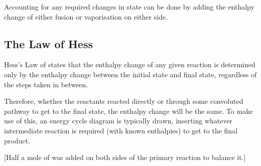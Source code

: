 
			Accounting for any required changes in state can be done by adding the enthalpy change of either fusion or vaporisation on either
			side.




		\subsection{The Law of Hess}

			Hess's Law of  states that the enthalpy change of any given reaction is determined only by the
			enthalpy change between the initial state and final state, regardless of the steps taken in between.

			Therefore, whether the reactants reacted directly or through some convoluted pathway to get to the final state, the enthalpy
			change will be the same. To make use of this, an energy cycle diagram is typically drawn, inserting whatever intermediate reaction
			is required (with known enthalpies) to get to the final product.

			[Half a mole of  was added on both sides of the primary reaction to balance it.]


